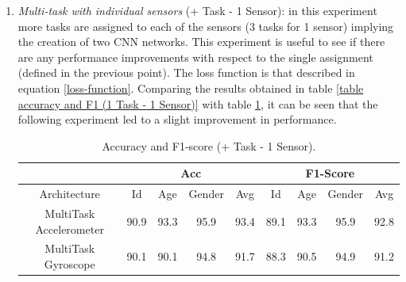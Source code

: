 \begin{enumerate}
    \item \emph{Multi-task with individual sensors} (+ Task - 1 Sensor): in this experiment 
    more tasks are assigned to each of the sensors (3 tasks for 1 
    sensor) implying the creation of two CNN networks. This experiment 
    is useful to see if there are any performance improvements with respect 
    to the single assignment (defined in the previous point). The loss function 
    is that described in equation \ref{loss-function}. Comparing the results obtained 
    in table \ref{table accuracy and F1 (1 Task - 1 Sensor)} with table \ref{table accuracy and F1 (more Task - 1 Sensor)}, it can be seen that the following experiment led 
    to a slight improvement in performance.
    \begin{table}[h!]
        \centering
        \begin{adjustbox}{max width=\textwidth}
        \begin{tabular}{|c||ccc|c||ccc|c|}
            \hline
                & \multicolumn{4}{c||}{Acc} & \multicolumn{4}{c|}{F1-Score} \\
            \hline
                Architecture & Id & Age & Gender & Avg & Id & Age & Gender & Avg\\
            \hline
                MultiTask Accelerometer & 90.9 & 93.3 & 95.9 & 93.4 & 89.1 & 93.3 & 95.9 & 92.8\\
                MultiTask Gyroscope & 90.1 & 90.1 & 94.8 & 91.7 & 88.3 & 90.5 & 94.9 & 91.2\\
            \hline 
        \end{tabular}
        \end{adjustbox}
        \caption{Accuracy and F1-score (+ Task - 1 Sensor).}
        \label{table accuracy and F1 (more Task - 1 Sensor)}
    \end{table}


\end{enumerate}
